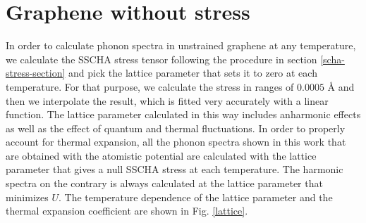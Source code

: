 \section{Graphene without stress}

In order to calculate phonon spectra in unstrained graphene at any temperature, we calculate the SSCHA stress tensor 
following the procedure in section \ref{scha-stress-section} and pick the lattice parameter that sets it to zero at 
each temperature. For that purpose, we calculate the stress in ranges of $0.0005$ \AA \hspace{0.1cm} and then we 
interpolate the result, which is fitted very accurately with a linear function. The lattice parameter calculated in 
this way includes anharmonic effects as well as the effect of quantum and thermal fluctuations. In order to properly 
account for thermal expansion, all the phonon spectra shown in this work that are obtained with the atomistic 
potential are calculated with the lattice parameter that gives a null SSCHA stress at each temperature. The harmonic 
spectra on the contrary is always calculated at the lattice parameter that minimizes $U$. The temperature dependence 
of the lattice parameter and the thermal expansion coefficient are shown in Fig. \ref{lattice}.
